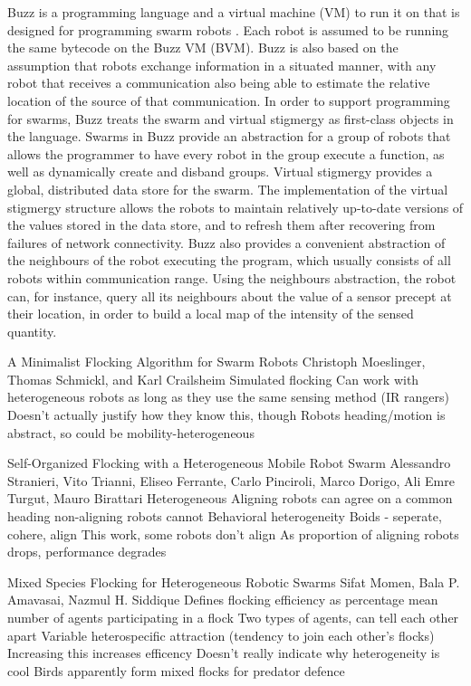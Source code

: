 Buzz is a programming language and a virtual machine (VM) to run it on that is designed for programming swarm robots \citep{PinciroliLB15}. 
Each robot is assumed to be running the same bytecode on the Buzz VM (BVM). 
Buzz is also based on the assumption that robots exchange information in a situated manner, with any robot that receives a communication also being able to estimate the relative location of the source of that communication.
In order to support programming for swarms, Buzz treats the swarm and virtual stigmergy as first-class objects in the language. 
Swarms in Buzz provide an abstraction for a group of robots that allows the programmer to have every robot in the group execute a function, as well as dynamically create and disband groups. 
Virtual stigmergy provides a global, distributed data store for the swarm. 
The implementation of the virtual stigmergy structure allows the robots to maintain relatively up-to-date versions of the values stored in the data store, and to refresh them after recovering from failures of network connectivity.
Buzz also provides a convenient abstraction of the neighbours of the robot executing the program, which usually consists of all robots within communication range. 
Using the neighbours abstraction, the robot can, for instance, query all its neighbours about the value of a sensor precept at their location, in order to build a local map of the intensity of the sensed quantity. 

A Minimalist Flocking Algorithm for Swarm Robots
Christoph Moeslinger, Thomas Schmickl, and Karl Crailsheim
	Simulated flocking 
	Can work with heterogeneous robots as long as they use the same sensing method (IR rangers)
		Doesn't actually justify how they know this, though
		Robots heading/motion is abstract, so could be mobility-heterogeneous

Self-Organized Flocking with a Heterogeneous Mobile Robot Swarm
Alessandro Stranieri, Vito Trianni, Eliseo Ferrante, Carlo Pinciroli, Marco Dorigo, Ali Emre Turgut, Mauro Birattari
	Heterogeneous
	Aligning robots can agree on a common heading
	non-aligning robots cannot
	Behavioral heterogeneity
	Boids - seperate, cohere, align
		This work, some robots don't align
	As proportion of aligning robots drops, performance degrades

Mixed Species Flocking for Heterogeneous Robotic Swarms
Sifat Momen, Bala P. Amavasai, Nazmul H. Siddique 
	Defines flocking efficiency as percentage mean number of agents participating in a flock
	Two types of agents, can tell each other apart
	Variable heterospecific attraction (tendency to join each other's flocks)
		Increasing this increases efficency
	Doesn't really indicate why heterogeneity is cool
		Birds apparently form mixed flocks for predator defence

